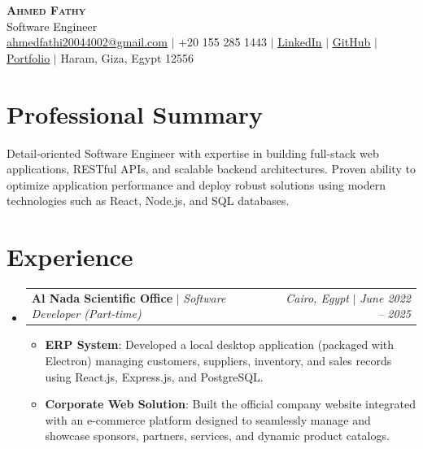 \documentclass[letterpaper,11pt]{article}
\makeatletter
\newcommand{\resumeItem}[2]{\item\small{\textbf{#1}{: #2 \vspace{-2pt}}}}
\newcommand{\resumeActivitySubheading}[4]{
  \vspace{-1pt}\item
    \begin{tabular*}{0.97\textwidth}{l@{\extracolsep{\fill}}r}
      \textbf{#1} $|$ \textit{\small#3} & \textit{\small#2} $|$ \textit{\small #4} \\
    \end{tabular*}\vspace{-5pt}
}
\newcommand{\resumeSubHeadingListStart}{\begin{itemize}[leftmargin=*]}
\newcommand{\resumeSubHeadingListEnd}{\end{itemize}}
\newcommand{\resumeItemListStart}{\begin{itemize}}
\newcommand{\resumeItemListEnd}{\end{itemize}\vspace{-5pt}}
\makeatother
\begin{document}
\begin{center}
    \textbf{\Huge \scshape Ahmed Fathy} \\ \vspace{1pt}
    \small Software Engineer \\
    \href{mailto:ahmedfathi20044002@gmail.com}{\underline{ahmedfathi20044002@gmail.com}} $|$
    +20 155 285 1443 $|$
    \href{https://www.linkedin.com/in/ahmedfathy-x1}{\underline{LinkedIn}} $|$
    \href{https://github.com/ahmedfathy0-0}{\underline{GitHub}} $|$
    \href{https://www.mrfathi.tech/}{\underline{Portfolio}} $|$
    Haram, Giza, Egypt 12556
\end{center}


\section{Professional Summary}
  \small Detail-oriented Software Engineer with expertise in building full-stack web applications, RESTful APIs, and scalable backend architectures. Proven ability to optimize application performance and deploy robust solutions using modern technologies such as React, Node.js, and SQL databases.
  \vspace{8pt}
\section{Experience}
  \resumeSubHeadingListStart
    \resumeActivitySubheading
      {Al Nada Scientific Office}{Cairo, Egypt}{Software Developer (Part-time)}{June 2022 -- 2025}
      \resumeItemListStart
        \resumeItem{ERP System}
          {Developed a local desktop application (packaged with Electron) managing customers, suppliers, inventory, and sales records using React.js, Express.js, and PostgreSQL.}
        \resumeItem{Corporate Web Solution}
          {Built the official company website integrated with an e-commerce platform designed to seamlessly manage and showcase sponsors, partners, services, and dynamic product catalogs.}
      \resumeItemListEnd
  \resumeSubHeadingListEnd
\end{document}
